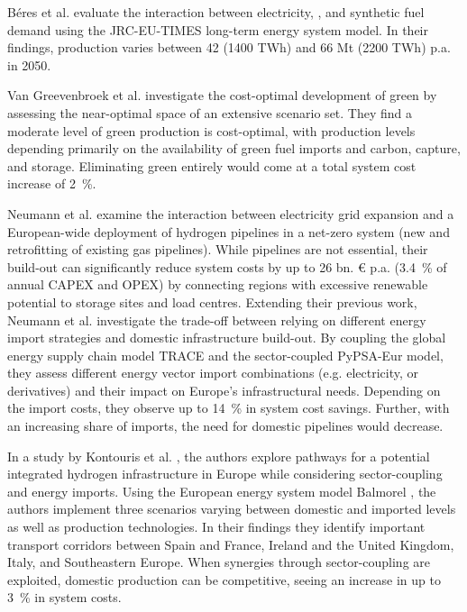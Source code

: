 \documentclass[final,5p,times,twocolumn,sort&compress]{elsarticle}
\begin{document}
Béres et al. \cite{beresWillHydrogenSynthetic2024} evaluate the interaction between electricity, , and synthetic fuel demand using the JRC-EU-TIMES long-term energy system model. In their findings,  production varies between 42 (1400 TWh) and 66 Mt (2200 TWh) p.a. in 2050. 

Van Greevenbroek et al. \cite{greevenbroekLittleLoseCase2024} investigate the cost-optimal development of green  by assessing the near-optimal space of an extensive scenario set. They find a moderate level of green  production is cost-optimal, with production levels depending primarily on the availability of green fuel imports and carbon, capture, and storage. Eliminating green  entirely would come at a total system cost increase of \SI{2}{\percent}. 

Neumann et al. \cite{neumannPotentialRoleHydrogen2023} examine the interaction between electricity grid expansion and a European-wide deployment of hydrogen pipelines in a net-zero system (new and retrofitting of existing gas pipelines). While  pipelines are not essential, their build-out can significantly reduce system costs by up to 26 bn. \euro{} p.a. (\SI{3.4}{\percent} of annual CAPEX and OPEX) by connecting regions with excessive renewable potential to storage sites and load centres. 
Extending their previous work, Neumann et al. \cite{neumannEnergyImportsInfrastructure2024} investigate the trade-off between relying on different energy import strategies and domestic infrastructure build-out. By coupling the global energy supply chain model TRACE \cite{hamppImportOptionsChemical2023} and the sector-coupled PyPSA-Eur model, they assess different energy vector import combinations (e.g. electricity,  or  derivatives) and their impact on Europe's infrastructural needs. Depending on the import costs, they observe up to \SI{14}{\percent} in system cost savings. Further, with an increasing share of  imports, the need for domestic  pipelines would decrease. 

In a study by Kontouris et al. \cite{kountourisUnifiedEuropeanHydrogen2024}, the authors explore pathways for a potential integrated hydrogen infrastructure in Europe while considering sector-coupling and energy imports. Using the European energy system model Balmorel \cite{wieseBalmorelOpenSource2018}, the authors implement three scenarios varying between domestic and imported  levels as well as  production technologies. In their findings they identify important  transport corridors between Spain and France, Ireland and the United Kingdom, Italy, and Southeastern Europe. When synergies through sector-coupling are exploited, domestic  production can be competitive, seeing an increase in up to \SI{3}{\percent} in system costs.
\end{document}

